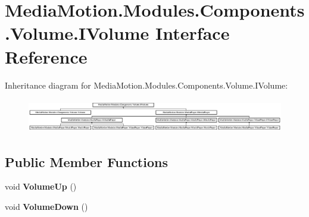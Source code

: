 \hypertarget{interface_media_motion_1_1_modules_1_1_components_1_1_volume_1_1_i_volume}{\section{Media\+Motion.\+Modules.\+Components.\+Volume.\+I\+Volume Interface Reference}
\label{interface_media_motion_1_1_modules_1_1_components_1_1_volume_1_1_i_volume}
}
Inheritance diagram for Media\+Motion.\+Modules.\+Components.\+Volume.\+I\+Volume\+:\begin{figure}[H]
\begin{center}
\leavevmode
\includegraphics[height=1.497326cm]{interface_media_motion_1_1_modules_1_1_components_1_1_volume_1_1_i_volume}
\end{center}
\end{figure}
\subsection*{Public Member Functions}
\begin{DoxyCompactItemize}
\item 
\hypertarget{interface_media_motion_1_1_modules_1_1_components_1_1_volume_1_1_i_volume_a27222259ab3085631f8723952059623a}{void {\bfseries Volume\+Up} ()}\label{interface_media_motion_1_1_modules_1_1_components_1_1_volume_1_1_i_volume_a27222259ab3085631f8723952059623a}

\item 
\hypertarget{interface_media_motion_1_1_modules_1_1_components_1_1_volume_1_1_i_volume_a079aa9e43fd201125391e17c86f83e6c}{void {\bfseries Volume\+Down} ()}\label{interface_media_motion_1_1_modules_1_1_components_1_1_volume_1_1_i_volume_a079aa9e43fd201125391e17c86f83e6c}

\end{DoxyCompactItemize}
